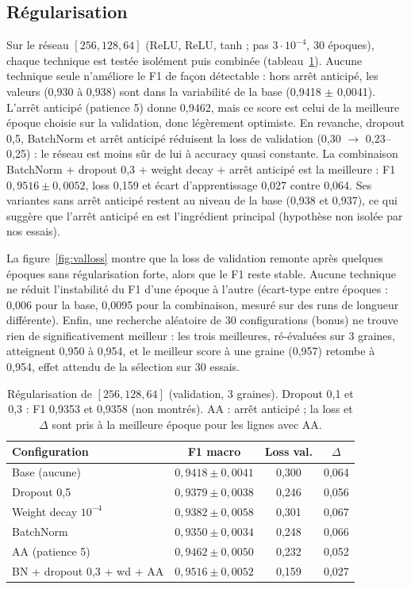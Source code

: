 \documentclass[10pt,a4paper]{article}
\begin{document}
\subsection{Régularisation}           %
Sur le réseau $[256,128,64]$ (ReLU, ReLU, tanh ; pas $3\!\cdot\!10^{-4}$, 30 époques), chaque technique est testée
isolément puis combinée (tableau~\ref{tab:reg}). Aucune technique seule n'améliore le F1 de façon détectable :
hors arrêt anticipé, les valeurs (0,930 à 0,938) sont dans la variabilité de la base (0,9418 $\pm$ 0,0041). L'arrêt
anticipé (patience 5) donne 0,9462, mais ce score est celui de la meilleure époque choisie sur la validation, donc
légèrement optimiste. En revanche, dropout 0,5, BatchNorm et arrêt anticipé réduisent la loss de validation
(0,30 $\to$ 0,23--0,25) : le réseau est moins sûr de lui à accuracy quasi constante. La combinaison BatchNorm
+ dropout 0,3 + weight decay + arrêt anticipé est la meilleure : F1 $0{,}9516\pm0{,}0052$, loss 0,159 et écart
d'apprentissage 0,027 contre 0,064. Ses variantes sans arrêt anticipé restent au niveau de la base (0,938 et 0,937),
ce qui suggère que l'arrêt anticipé en est l'ingrédient principal (hypothèse non isolée par nos essais).

La figure~\ref{fig:valloss} montre que la loss de validation remonte après quelques époques sans régularisation
forte, alors que le F1 reste stable. Aucune technique ne réduit l'instabilité du F1 d'une époque à l'autre
(écart-type entre époques : 0,006 pour la base, 0,0095 pour la combinaison, mesuré sur des runs de longueur
différente). Enfin, une recherche aléatoire de 30 configurations (bonus) ne trouve rien de significativement
meilleur : les trois meilleures, ré-évaluées sur 3 graines, atteignent 0,950 à 0,954, et le meilleur score à une
graine (0,957) retombe à 0,954, effet attendu de la sélection sur 30 essais.

\begin{table}[!htb]
\centering\footnotesize
\setlength{\tabcolsep}{2pt}
\caption{Régularisation de $[256,128,64]$ (validation, 3 graines). Dropout 0,1 et 0,3 : F1 0,9353 et 0,9358
(non montrés). AA : arrêt anticipé ; la loss et $\Delta$ sont pris à la meilleure époque pour les lignes avec AA.}
\label{tab:reg}
\begin{tabular}{@{}lccc@{}}
\toprule
Configuration & F1 macro & Loss val. & $\Delta$ \\
\midrule
Base (aucune) & $0{,}9418\pm0{,}0041$ & 0,300 & 0,064 \\
Dropout 0,5 & $0{,}9379\pm0{,}0038$ & 0,246 & 0,056 \\
Weight decay $10^{-4}$ & $0{,}9382\pm0{,}0058$ & 0,301 & 0,067 \\
BatchNorm & $0{,}9350\pm0{,}0034$ & 0,248 & 0,066 \\
AA (patience 5) & $0{,}9462\pm0{,}0050$ & 0,232 & 0,052 \\
BN + dropout 0,3 + wd + AA & $0{,}9516\pm0{,}0052$ & 0,159 & 0,027 \\
\bottomrule
\end{tabular}
\end{table}
\end{document}
